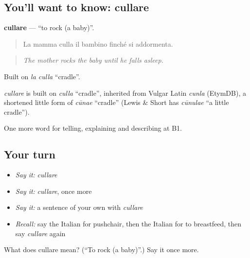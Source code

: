 \subsection*{You'll want to know: cullare}
\textbf{cullare} — \textquotedblleft{}to rock (a baby)\textquotedblright{}.

\begin{quote}
La mamma culla il bambino finché si addormenta.
\end{quote}

\begin{quote}
\emph{The mother rocks the baby until he falls asleep.}
\end{quote}

Built on \emph{la culla} \textquotedblleft{}cradle\textquotedblright{}.

\begin{cousinweb}
\emph{cullare} is built on \emph{culla} \textquotedblleft{}cradle\textquotedblright{}, inherited from Vulgar Latin \emph{cunla} (EtymDB), a shortened little form of \emph{cūnae} \textquotedblleft{}cradle\textquotedblright{} (Lewis \& Short has \emph{cūnulae} \textquotedblleft{}a little cradle\textquotedblright{}).
\end{cousinweb}

\begin{grammarlens}[title={What you've built}]
One more word for telling, explaining and describing at B1.
\end{grammarlens}

\subsection*{Your turn}
\begin{itemize}
\raggedright
  \item \emph{Say it:} \emph{cullare}
  \item \emph{Say it:} \emph{cullare}, once more
  \item \emph{Say it:} a sentence of your own with \emph{cullare}
  \item \emph{Recall:} say the Italian for pushchair, then the Italian for to breastfeed, then say \emph{cullare} again
\end{itemize}

\begin{tcolorbox}[breakable,colback=teal!4,colframe=teal!35!black,title={Before you move on}]
What does cullare mean? (\textquotedblleft{}To rock (a baby)\textquotedblright{}.) Say it once more.
\end{tcolorbox}
